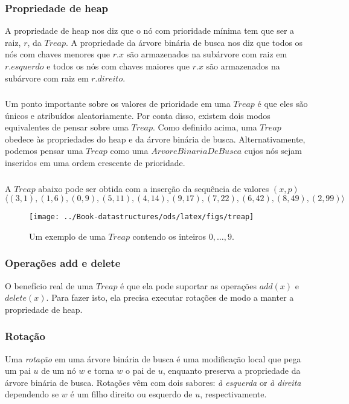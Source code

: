 \documentclass{beamer}
\newcommand{\figlabel}[1]{\label{fig:#1}}
\begin{document}
\begin{frame}
\frametitle{Propriedade de heap}
A propriedade de heap nos diz
que o nó com prioridade mínima tem que ser a raiz, $r$, da $Treap$.
A propriedade da árvore binária de busca nos diz que todos os nós com chaves menores
que $r.x$ são armazenados na subárvore com raiz em $r.esquerdo$ e todos os nós com
chaves maiores que $r.x$ são armazenados na subárvore com raiz em $r.direito$.
\end{frame}

\begin{frame}
\frametitle{}
Um ponto importante sobre os valores de prioridade em uma $Treap$ é que eles
são únicos e atribuídos aleatoriamente.  Por conta disso, existem dois modos
equivalentes de pensar sobre uma $Treap$.  Como definido acima, uma
$Treap$ obedece às propriedades do heap e da árvore binária de busca.  Alternativamente,
podemos pensar uma $Treap$ como uma $ArvoreBinariaDeBusca$ cujos nós
sejam inseridos em uma ordem crescente de prioridade.
\end{frame}

\begin{frame}
\frametitle{}
A $Treap$ abaixo pode ser obtida com a inserção da sequência de valores $(x,p)$
\[
  \langle
   (3,1), (1,6), (0,9), (5,11), (4,14), (9,17), (7,22), (6,42), (8,49), (2,99)
  \rangle
\]
\begin{figure}
  \begin{center}
    \texttt{[image: ../Book-datastructures/ods/latex/figs/treap]}
  \end{center}
  \caption[Uma Treap]{Um exemplo de uma $Treap$ contendo os inteiros
  $0,\ldots,9$.}
  \figlabel{treap}
\end{figure}
\end{frame}

\begin{frame}
\frametitle{Operações add e delete}
O benefício real de uma $Treap$ é que ela pode 
suportar as operações $add(x)$ e $delete(x)$.  Para
fazer isto, ela precisa executar rotações de modo a manter 
a propriedade de heap. 
\end{frame}

\begin{frame}
\frametitle{Rotação}
Uma \emph{rotação}
%
em uma árvore binária de busca
é uma modificação local que pega um pai $u$ de um nó $w$
e torna $w$ o pai de $u$, enquanto preserva a propriedade da árvore binária de busca.
 Rotações vêm com dois sabores: \emph{à esquerda} or \emph{à direita}
dependendo se $w$ é um filho direito ou esquerdo de $u$, respectivamente.
\end{frame}
\end{document}
